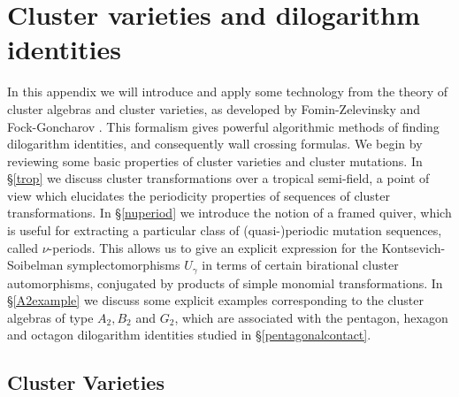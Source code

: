 \documentclass[12pt,reqno]{article}
\numberwithin{equation}{section}
\numberwithin{equation}{section}
\begin{document}
\section{Cluster varieties and dilogarithm identities\label{app_cluster}}

In this appendix we will introduce and apply some technology from the theory of cluster algebras and
cluster varieties, as developed by Fomin-Zelevinsky \cite{MR1887642,MR2295199}
and Fock-Goncharov \cite{FG,MR2470108}. This formalism gives powerful
algorithmic methods of finding dilogarithm identities, and consequently wall crossing formulas. We begin by
reviewing some basic properties of cluster varieties and
cluster mutations. In \S \ref{trop} we discuss cluster
transformations over a tropical semi-field, a point of
view which elucidates the periodicity
properties of sequences of cluster transformations. In \S \ref{nuperiod}
we introduce the notion of a framed quiver, which is useful for
extracting a particular class of (quasi-)periodic mutation
sequences, called $\nu$-periods. This allows us to give an explicit expression for
the Kontsevich-Soibelman symplectomorphisms $U_\gamma$ in terms of
certain birational cluster automorphisms, conjugated by products of
simple monomial transformations. In \S \ref{A2example}
we discuss some explicit examples corresponding to
the cluster algebras of type $A_2, B_2$ and $G_2$, which are associated with the pentagon,
hexagon and octagon dilogarithm identities studied in \S\ref{pentagonalcontact}.


\subsection{Cluster Varieties}
\label{clustervarieties}
\end{document}
